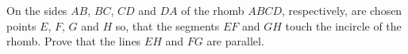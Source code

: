 \problem{}
On the sides $AB$, $BC$, $CD$ and $DA$ of the rhomb $ABCD$, respectively, are chosen points $E$, $F$, $G$ and $H$ so, that the segments $EF$ and $GH$ touch the incircle of the rhomb.
Prove that the lines $EH$ and $FG$ are parallel.

\solution

\endproblem

